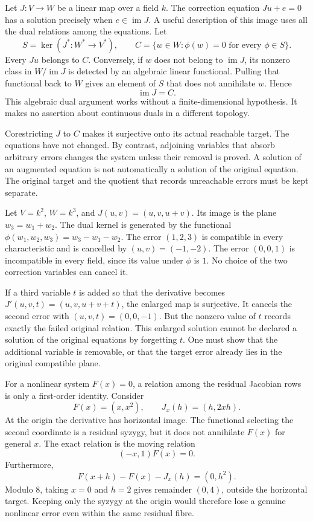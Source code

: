 Let $J:V\to W$ be a linear map over a field $k$. The correction equation
$Ju+e=0$ has a solution precisely when $e\in\operatorname{im}J$. A useful
description of this image uses all the dual relations among the equations.
Let
\[
 S=\ker(J^*:W^*\to V^*),\qquad
 C=\{w\in W:\phi(w)=0\text{ for every }\phi\in S\}.
\]
Every $Ju$ belongs to $C$. Conversely, if $w$ does not belong to
$\operatorname{im}J$, its nonzero class in $W/\operatorname{im}J$ is
detected by an algebraic linear functional. Pulling that functional back
to $W$ gives an element of $S$ that does not annihilate $w$. Hence
\begin{equation}
 \operatorname{im}J=C.
 \label{eq:appendix-compatible-target}
\end{equation}
This algebraic dual argument works without a finite-dimensional hypothesis.
It makes no assertion about continuous duals in a different topology.

Corestricting $J$ to $C$ makes it surjective onto its actual reachable
target. The equations have not changed. By contrast, adjoining variables
that absorb arbitrary errors changes the system unless their removal is
proved. A solution of an augmented equation is not automatically a solution
of the original equation. The original target and the quotient that records
unreachable errors must be kept separate.

\begin{example}
Let $V=k^2$, $W=k^3$, and
$J(u,v)=(u,v,u+v)$. Its image is the plane $w_3=w_1+w_2$. The dual
kernel is generated by the functional
$\phi(w_1,w_2,w_3)=w_3-w_1-w_2$. The error $(1,2,3)$ is compatible
in every characteristic and is cancelled by $(u,v)=(-1,-2)$. The error
$(0,0,1)$ is incompatible in every field, since its value under $\phi$
is $1$. No choice of the two correction variables can cancel it.

If a third variable $t$ is added so that the derivative becomes
$J'(u,v,t)=(u,v,u+v+t)$, the enlarged map is surjective. It cancels the
second error with $(u,v,t)=(0,0,-1)$. But the nonzero value of $t$ records
exactly the failed original relation. This enlarged solution cannot be
declared a solution of the original equations by forgetting $t$. One must
show that the additional variable is removable, or that the target error
already lies in the original compatible plane.
\end{example}

For a nonlinear system $F(x)=0$, a relation among the residual Jacobian
rows is only a first-order identity. Consider
\[
 F(x)=(x,x^2),\qquad J_x(h)=(h,2xh).
\]
At the origin the derivative has horizontal image. The functional selecting
the second coordinate is a residual syzygy, but it does not annihilate
$F(x)$ for general $x$. The exact relation is the moving relation
\[
 (-x,1)F(x)=0.
\]
Furthermore,
\[
 F(x+h)-F(x)-J_x(h)=(0,h^2).
\]
Modulo $8$, taking $x=0$ and $h=2$ gives remainder $(0,4)$, outside the
horizontal target. Keeping only the syzygy at the origin would therefore
lose a genuine nonlinear error even within the same residual fibre.

